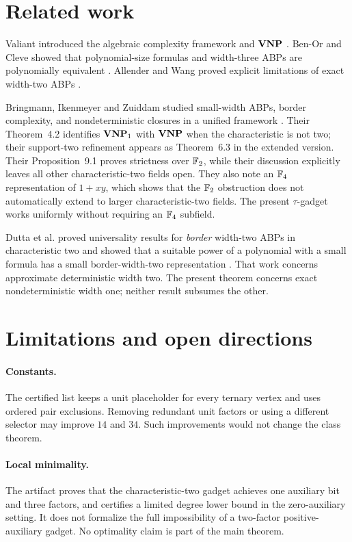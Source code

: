 \section{Related work}\label{sec:related}

Valiant introduced the algebraic complexity framework and \(\mathbf{VNP}\)
\cite{Valiant1979,Valiant1980}.  Ben-Or and Cleve showed that polynomial-size formulas and
width-three ABPs are polynomially equivalent \cite{BenOrCleve1992}.  Allender and Wang
proved explicit limitations of exact width-two ABPs \cite{AllenderWang2016}.

Bringmann, Ikenmeyer and Zuiddam studied small-width ABPs, border complexity, and
nondeterministic closures in a unified framework
\cite{BringmannIkenmeyerZuiddam2018,BringmannIkenmeyerZuiddam2017}.  Their Theorem~4.2
identifies \(\mathbf{VNP}_{1}\) with \(\mathbf{VNP}\) when the characteristic is not two; their support-two
refinement appears as Theorem~6.3 in the extended version.  Their Proposition~9.1 proves
strictness over \(\mathbb{F}_2\), while their discussion explicitly leaves all other
characteristic-two fields open.  They also note an \(\mathbb{F}_4\) representation of \(1+xy\),
which shows that the \(\mathbb{F}_2\) obstruction does not automatically extend to larger
characteristic-two fields.  The present \(\tau\)-gadget works uniformly without requiring
an \(\mathbb{F}_4\) subfield.

Dutta et al. proved universality results for \emph{border} width-two ABPs in
characteristic two and showed that a suitable power of a polynomial with a small formula
has a small border-width-two representation \cite{DuttaEtAl2024}.  That work concerns
approximate deterministic width two.  The present theorem concerns exact nondeterministic
width one; neither result subsumes the other.

\section{Limitations and open directions}\label{sec:open}

\paragraph{Constants.}
The certified list keeps a unit placeholder for every ternary vertex and uses ordered pair
exclusions.  Removing redundant unit factors or using a different selector may improve
\(14\) and \(34\).  Such improvements would not change the class theorem.

\paragraph{Local minimality.}
The artifact proves that the characteristic-two gadget achieves one auxiliary bit and three
factors, and certifies a limited degree lower bound in the zero-auxiliary setting.  It does
not formalize the full impossibility of a two-factor positive-auxiliary gadget.  No
optimality claim is part of the main theorem.

